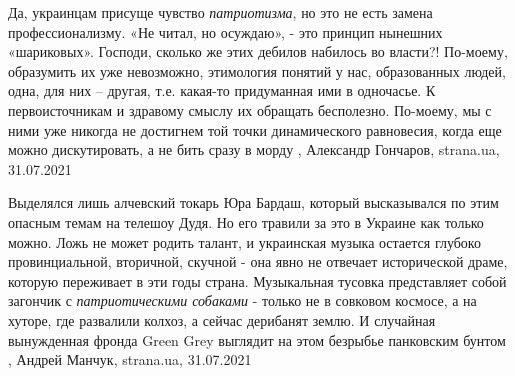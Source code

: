 Да, украинцам присуще чувство \emph{патриотизма}, но это не есть замена
профессионализму. «Не читал, но осуждаю», - это принцип нынешних «шариковых».
Господи, сколько же этих дебилов набилось во власти?! По-моему, образумить их
уже невозможно, этимология понятий у нас, образованных людей, одна, для них –
другая, т.е. какая-то придуманная ими в одночасье.  К первоисточникам и
здравому смыслу их обращать бесполезно. По-моему, мы с ними уже никогда не
достигнем той точки динамического равновесия, когда еще можно дискутировать, а
не бить сразу в морду
, 
Александр Гончаров, strana.ua, 31.07.2021

Выделялся лишь алчевский токарь Юра Бардаш, который высказывался по этим
опасным темам на телешоу Дудя. Но его травили за это в Украине как только
можно.  Ложь не может родить талант, и украинская музыка остается глубоко
провинциальной, вторичной, скучной - она явно не отвечает исторической драме,
которую переживает в эти годы страна. Музыкальная тусовка представляет собой
загончик с \emph{патриотическими собаками} - только не в совковом космосе, а на
хуторе, где развалили колхоз, а сейчас дерибанят землю.  И случайная
вынужденная фронда Green Grey выглядит на этом безрыбье панковским бунтом
, 
Андрей Манчук, strana.ua, 31.07.2021
